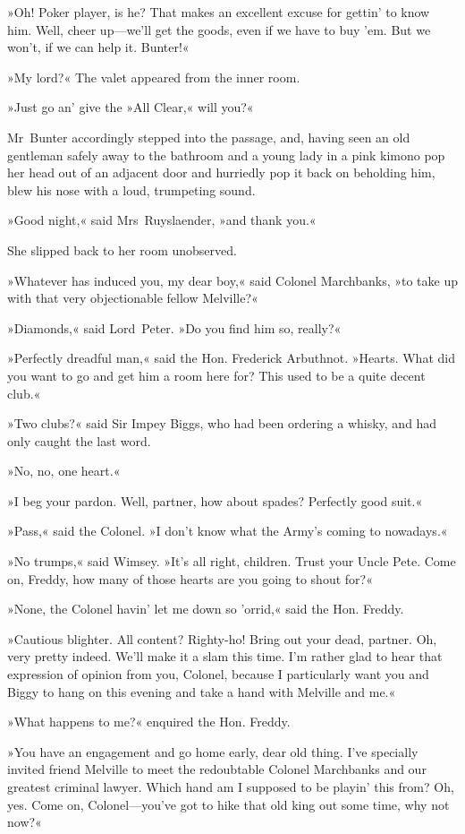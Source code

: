 »Oh! Poker player, is he? That makes an excellent excuse for gettin' to know him. Well, cheer up—we'll get the goods, even if we have to buy 'em. But we won't, if we can help it. Bunter!«

»My lord?« The valet appeared from the inner room.

»Just go an' give the »All Clear,« will you?«

Mr~Bunter accordingly stepped into the passage, and, having seen an old gentleman safely away to the bathroom and a young lady in a pink kimono pop her head out of an adjacent door and hurriedly pop it back on beholding him, blew his nose with a loud, trumpeting sound.

»Good night,« said Mrs~Ruyslaender, »and thank you.«

She slipped back to her room unobserved.

»Whatever has induced you, my dear boy,« said Colonel Marchbanks, »to take up with that very objectionable fellow Melville?«

»Diamonds,« said Lord~Peter. »Do you find him so, really?«

»Perfectly dreadful man,« said the Hon. Frederick Arbuthnot. »Hearts. What did you want to go and get him a room here for? This used to be a quite decent club.«

»Two clubs?« said Sir Impey Biggs, who had been ordering a whisky, and had only caught the last word.

»No, no, one heart.«

»I beg your pardon. Well, partner, how about spades? Perfectly good suit.«

»Pass,« said the Colonel. »I don't know what the Army's coming to nowadays.«

»No trumps,« said Wimsey. »It's all right, children. Trust your Uncle Pete. Come on, Freddy, how many of those hearts are you going to shout for?«

»None, the Colonel havin' let me down so 'orrid,« said the Hon. Freddy.

»Cautious blighter. All content? Righty-ho! Bring out your dead, partner. Oh, very pretty indeed. We'll make it a slam this time. I'm rather glad to hear that expression of opinion from you, Colonel, because I particularly want you and Biggy to hang on this evening and take a hand with Melville and me.«

»What happens to me?« enquired the Hon. Freddy.

»You have an engagement and go home early, dear old thing. I've specially invited friend Melville to meet the redoubtable Colonel Marchbanks and our greatest criminal lawyer. Which hand am I supposed to be playin' this from? Oh, yes. Come on, Colonel—you've got to hike that old king out some time, why not now?«

